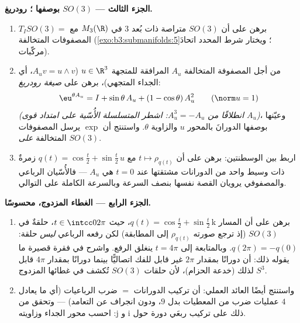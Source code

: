 \begin{problem}
\medskip
\noindent\textbf{الجزء الثالث --- $SO(3)$ بوصفها ؛ رودريغ.}
\begin{enumerate}[resume]
  \item برهن على أن $SO(3)$  متراصة ذات بُعد $3$
        في $M_3(\R)$ مع $T_ISO(3) =$
        المصفوفات المتخالفة
        (\cref{exo:b3:submanifolds:5}؛ ويختار شرط المحدد اتحادَ مركّبات).
  \item من أجل المصفوفة المتخالفة $A_u$ المرافقة للمتجهة
        $u \in \R^3$ ($A_uv = u\wedge v$، أي الجداء المتجهي)، برهن على
        \emph{صيغة رودريغ}:
        \[
        \eu^{\theta A_u} = I + \sin\theta\,A_u + (1 -
        \cos\theta)\,A_u^2 \qquad (\norm u = 1)
        \]
        \emph{(انطلاقًا من $A_u^3 = -A_u$: اشطر المتسلسلة
        الأُسّية على امتداد قوى $A_u$)}، وعيّنها بوصفها
        الدورانَ بالمحور $u$ والزاوية $\theta$. واستنتج أن
        $\exp$ يرسل المصفوفات المتخالفة \emph{على} $SO(3)$.
  \item اربط بين الوسطنتين: برهن على أن $t
        \mapsto \rho_{q(t)}$ مع $q(t) = \cos\frac t2 +
        \sin\frac t2\,u$
        زمرةٌ ذات وسيط واحد من الدورانات مشتقتها عند $t = 0$
        هي $A_u$ --- فالأُسّيان الرباعي والمصفوفي يرويان
        القصة نفسها بنصف السرعة وبالسرعة الكاملة على التوالي.
\end{enumerate}

\medskip
\noindent\textbf{الجزء الرابع --- الغطاء المزدوج، محسوسًا.}
\begin{enumerate}[resume]
  \item برهن على أن المسار $q(t) = \cos\frac t2 + \sin\frac
        t2\,\mathrm k$، حيث $t \in \intcc0{2\pi}$، حلقةٌ في
        $SO(3)$ (إذ ترجع صورته $\rho_{q(t)}$ إلى المطابقة)
        لكن رفعه الرباعي \emph{ليس} حلقة: $q(2\pi) = -q(0)$. وبالمتابعة
        إلى $t = 4\pi$ ينغلق الرفع. واشرح في فقرة قصيرة ما
        يقوله ذلك: أن دورانًا بمقدار $2\pi$ غير قابل للفك
        اتصاليًّا بينما دورانًا بمقدار $4\pi$ قابل لذلك (خدعة
        الحزام)، لأن حلقات $SO(3)$ تُكشف في غطائها المزدوج
        $S^3$.
  \item واستنتج أيضًا العائد العملي: أن تركيب الدورانات
        $=$ ضرب الرباعيات (أي ما يعادل $4$ عمليات ضرب من
        المعطيات بدل $9$، ودون انجراف عن التعامد) --- وتحقق
        من ذلك على تركيب ربعَي دورة حول $\mathrm i$
        و $\mathrm j$: احسب محور الجداء وزاويته.
\end{enumerate}


\end{problem}
